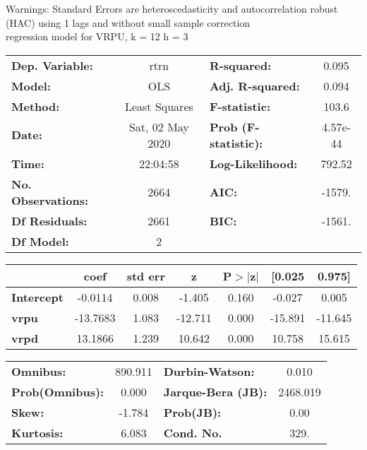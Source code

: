 Warnings: \newline
 [1] Standard Errors are heteroscedasticity and autocorrelation robust (HAC) using 1 lags and without small sample correction\\ 

regression model for VRPU, k = 12 h = 3\begin{center}
\begin{tabular}{lclc}
\toprule
\textbf{Dep. Variable:}    &       rtrn       & \textbf{  R-squared:         } &     0.095   \\
\textbf{Model:}            &       OLS        & \textbf{  Adj. R-squared:    } &     0.094   \\
\textbf{Method:}           &  Least Squares   & \textbf{  F-statistic:       } &     103.6   \\
\textbf{Date:}             & Sat, 02 May 2020 & \textbf{  Prob (F-statistic):} &  4.57e-44   \\
\textbf{Time:}             &     22:04:58     & \textbf{  Log-Likelihood:    } &    792.52   \\
\textbf{No. Observations:} &        2664      & \textbf{  AIC:               } &    -1579.   \\
\textbf{Df Residuals:}     &        2661      & \textbf{  BIC:               } &    -1561.   \\
\textbf{Df Model:}         &           2      & \textbf{                     } &             \\
\bottomrule
\end{tabular}
\begin{tabular}{lcccccc}
                   & \textbf{coef} & \textbf{std err} & \textbf{z} & \textbf{P$> |$z$|$} & \textbf{[0.025} & \textbf{0.975]}  \\
\midrule
\textbf{Intercept} &      -0.0114  &        0.008     &    -1.405  &         0.160        &       -0.027    &        0.005     \\
\textbf{vrpu}      &     -13.7683  &        1.083     &   -12.711  &         0.000        &      -15.891    &      -11.645     \\
\textbf{vrpd}      &      13.1866  &        1.239     &    10.642  &         0.000        &       10.758    &       15.615     \\
\bottomrule
\end{tabular}
\begin{tabular}{lclc}
\textbf{Omnibus:}       & 890.911 & \textbf{  Durbin-Watson:     } &    0.010  \\
\textbf{Prob(Omnibus):} &   0.000 & \textbf{  Jarque-Bera (JB):  } & 2468.019  \\
\textbf{Skew:}          &  -1.784 & \textbf{  Prob(JB):          } &     0.00  \\
\textbf{Kurtosis:}      &   6.083 & \textbf{  Cond. No.          } &     329.  \\
\bottomrule
\end{tabular}
\end{center}

